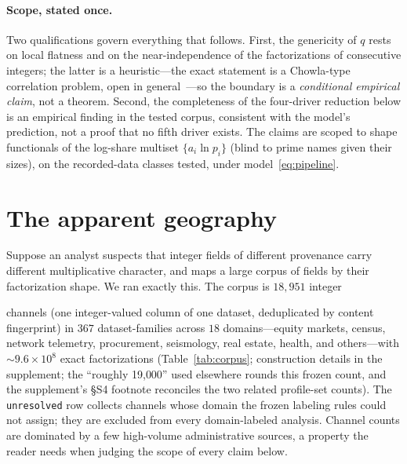 \documentclass[12pt]{article}
\begin{document}
\paragraph{Scope, stated once.}
Two qualifications govern everything that follows. First, the genericity of
$q$ rests on local flatness and on the near-independence of the factorizations
of consecutive integers; the latter is a heuristic---the exact statement is a
Chowla-type correlation problem, open in
general~\citep{taoteravainen2019}---so the boundary is a
\emph{conditional empirical claim}, not a theorem. Second, the completeness of
the four-driver reduction below is an empirical finding in the tested corpus,
consistent with the model's prediction, not a proof that no fifth driver
exists. The claims are scoped to shape functionals of the log-share multiset
$\{a_i \ln p_i\}$ (blind to prime names given their sizes), on the
recorded-data classes tested, under model~\eqref{eq:pipeline}.

\section{The apparent geography}
\label{sec:geography}

Suppose an analyst suspects that integer fields of different provenance carry
different multiplicative character, and maps a large corpus of fields by their
factorization shape. We ran exactly this. The corpus is $18{,}951$ integer
%

channels (one integer-valued column of one dataset, deduplicated by content
fingerprint) in $367$ dataset-families across $18$ domains---equity markets, census,
network telemetry, procurement, seismology, real estate, health, and
others---with ${\sim}9.6\times10^{8}$ exact factorizations
(Table~\ref{tab:corpus}; construction details in the supplement; the
``roughly 19{,}000'' used elsewhere rounds this frozen count, and the
supplement's \S S4 footnote reconciles the two related profile-set counts).
The \texttt{unresolved} row collects channels whose domain the frozen
labeling rules could not assign; they are excluded from every domain-labeled
analysis. Channel
counts are dominated by a few high-volume administrative sources, a property
the reader needs when judging the scope of every claim below.
\end{document}

